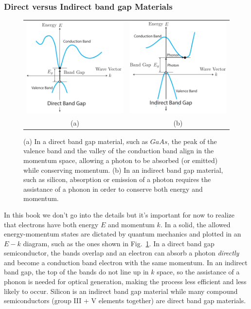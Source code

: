 \subsubsection*{Direct versus Indirect band gap Materials}
\begin{figure}[tb]
\centering
\begin{tabular}{cc}
\includegraphics[width=.4\columnwidth]{bandgap_direct} & 
\includegraphics[width=.4\columnwidth]{bandgap_indirect}\\
(a) & (b)\\
\end{tabular}
\caption{(a) In a direct band gap material, such as $GaAs$, the peak of the valence band and the valley of the conduction band align in the momentum space, allowing a photon to be absorbed (or emitted) while conserving momentum.  (b)  In an indirect band gap material, such as silicon, absorption or emission of a photon requires the assistance of a phonon in order to conserve both energy and momentum.}
\label{fig:band gap_direct}
\end{figure}
In this book we don't go into the details but it's important for now to realize that electrons have both energy $E$ and momentum $k$.  In a solid, the allowed energy-momentum states are dictated by quantum mechanics and plotted in an $E-k$ diagram, such as the ones shown in Fig.~\ref{fig:band gap_direct}.  In a direct band gap semiconductor, the bands overlap and an electron can absorb a photon \emph{directly} and become a conduction band electron with the same momentum.   In an indirect band gap, the top of the bands do not line up in $k$ space, so the assistance of a phonon is needed for optical generation, making the process less efficient and less likely to occur.  Silicon is an indirect band gap material while many compound semiconductors (group III + V elements together) are direct band gap materials.
